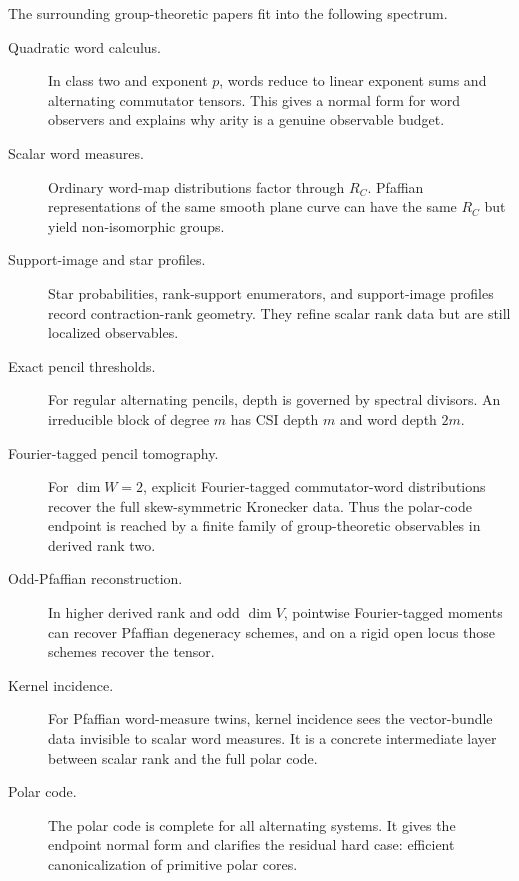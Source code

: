 \documentclass[11pt]{article}
\begin{document}
The surrounding group-theoretic papers fit into the following spectrum.

\begin{description}
\item[Quadratic word calculus.]
In class two and exponent $p$, words reduce to linear exponent sums and alternating commutator tensors. This gives a normal form for word observers and explains why arity is a genuine observable budget.

\item[Scalar word measures.]
Ordinary word-map distributions factor through $R_C$. Pfaffian representations of the same smooth plane curve can have the same $R_C$ but yield non-isomorphic groups.

\item[Support-image and star profiles.]
Star probabilities, rank-support enumerators, and support-image profiles record contraction-rank geometry. They refine scalar rank data but are still localized observables.

\item[Exact pencil thresholds.]
For regular alternating pencils, depth is governed by spectral divisors. An irreducible block of degree $m$ has CSI depth $m$ and word depth $2m$.

\item[Fourier-tagged pencil tomography.]
For $\dim W=2$, explicit Fourier-tagged commutator-word distributions recover the full skew-symmetric Kronecker data. Thus the polar-code endpoint is reached by a finite family of group-theoretic observables in derived rank two.

\item[Odd-Pfaffian reconstruction.]
In higher derived rank and odd $\dim V$, pointwise Fourier-tagged moments can recover Pfaffian degeneracy schemes, and on a rigid open locus those schemes recover the tensor.

\item[Kernel incidence.]
For Pfaffian word-measure twins, kernel incidence sees the vector-bundle data invisible to scalar word measures. It is a concrete intermediate layer between scalar rank and the full polar code.

\item[Polar code.]
The polar code is complete for all alternating systems. It gives the endpoint normal form and clarifies the residual hard case: efficient canonicalization of primitive polar cores.
\end{description}
\end{document}
